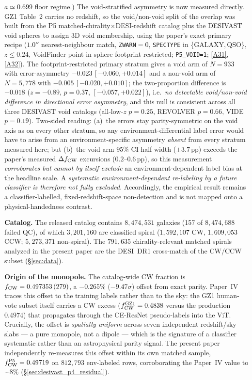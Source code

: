 \documentclass[aps,prd,twocolumn,superscriptaddress,showpacs,preprintnumbers,nofootinbib,longbibliography,floatfix]{revtex4-2}
\newcommand{\repoBase}{https://github.com/Hubify-Projects/bigbounce/blob/main}
\begin{document}
$a\!\simeq\!0.699$ floor regime.) The void-stratified asymmetry is now measured directly.
GZ1 Table~2 carries no redshift, so the void/non-void split of the overlap
was built from the P5 matched-chirality$\times$DESI-redshift catalog plus the
DESIVAST void spheres to assign 3D void membership, using the paper's exact
primary recipe ($1.0''$ nearest-neighbour match, \texttt{ZWARN}$=0$,
\texttt{SPECTYPE} in \{GALAXY,\,QSO\}, $z\le0.24$, VoidFinder point-in-sphere
footprint-restricted; \texttt{P5\_VOID=1};
\href{\repoBase/pipelines/p2\_chirality/outputs/gz1\_stratified\_confusion.json}{[A31]},
\href{\repoBase/pipelines/p2\_chirality/scripts/gz1\_stratified\_confusion.py}{[A32]}).
The footprint-restricted primary stratum gives a void arm of $N=933$ with
error-asymmetry $-0.023\,[-0.060,+0.014]$ and a non-void arm of $N=5{,}778$
with $-0.005\,[-0.020,+0.010]$; the two-proportion difference is $-0.018$
($z=-0.89$, $p=0.37$, $[-0.057,+0.022]$), i.e.\ \emph{no detectable
void/non-void difference in directional error asymmetry}, and this null is
consistent across all three DESIVAST void catalogs (all-low-$z$ $p=0.25$,
REVOLVER $p=0.66$, VIDE $p=0.19$). Two-sided reading: (a)~the errors stay
parity-symmetric on the void axis as on every other stratum, so any
environment-differential label error would have to arise from an
environment-specific asymmetry \emph{absent} from every stratum measured
here; but (b)~the void-arm $95\%$ CI half-width ($\pm3.7$\,pp) exceeds the
paper's measured $\Delta f_{\rm CW}$ excursions ($0.2$--$0.6$\,pp), so this measurement
\emph{corroborates but cannot by itself exclude} an environment-dependent
label bias at the headline scale. A \emph{systematic
environment-dependent re-labeling by a future classifier is therefore
not fully excluded}. Accordingly, the empirical result remains a
classifier-labelled, fixed-redshift-space non-detection and is not mapped
onto a physical-handedness contrast.

\textbf{Catalog.} The released catalog contains $8{,}474{,}531$
galaxies (157 of $8{,}474{,}688$ failed QC), of which $3{,}201{,}160$
are classified spiral ($1{,}592{,}107$ CW, $1{,}609{,}053$ CCW;
$5{,}273{,}371$ non-spiral). The $791{,}635$ chirality-relevant matched
spirals analyzed in the present paper are the DESI~DR1 cross-match of
the CW/CCW subset (\S\ref{sec:data}).

\textbf{Origin of the monopole.} The catalog-wide CW fraction is
$f_{\rm CW}=0.497353\,(279)$, a $-0.265\%$ ($-9.47\sigma$) offset from
exact parity. Paper~IV traces this offset to the training labels rather
than to the sky: the GZ1 human-vote subset itself carries a CW excess
($f_{\rm CW}^{\rm GZ1}=0.4838$ versus the production $0.4974$) that
propagates through the CE-ResNet pseudo-labels into the ViT. Crucially,
the offset is \emph{spatially uniform} across seven independent
redshift/sky slabs --- a pure monopole, not a dipole --- which is the
signature of a classifier systematic rather than an astrophysical parity
signal. The present paper independently re-measures this offset within
its own matched sample, $f_{\rm CW}^{\rm P5}=0.49719$ on $812{,}793$
env-labeled rows, corroborating the Paper~IV value to ${\sim}8\%$
(\S\ref{sec:desivast_p4_residual}).
\end{document}
